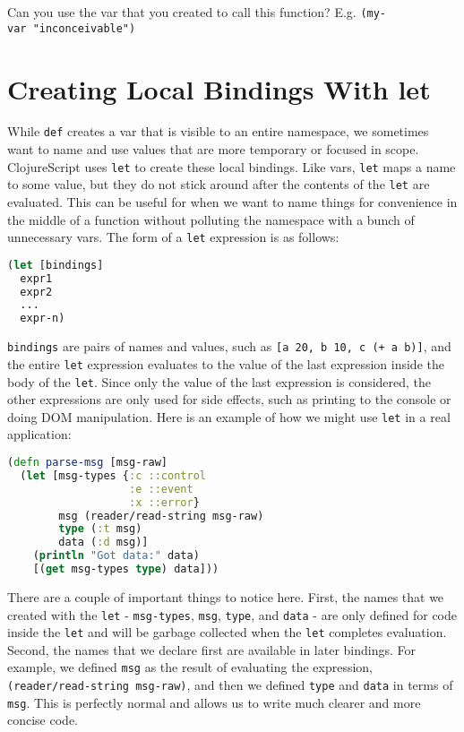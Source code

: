 \documentclass[10pt,twoside,openright]{memoir}
\begin{document}
Can you use the var that you created to call this function? E.g.
\texttt{(my-var\ "inconceivable")}

\section{Creating Local Bindings With let}

While \texttt{def} creates a var that is visible to an entire namespace,
we sometimes want to name and use values that are more temporary or
focused in scope. ClojureScript uses \texttt{let} to create these local
bindings. Like vars, \texttt{let} maps a name to some value, but they do
not stick around after the contents of the \texttt{let} are evaluated.
This can be useful for when we want to name things for convenience in
the middle of a function without polluting the namespace with a bunch of
unnecessary vars. The form of a \texttt{let} expression is as follows:

\begin{lstlisting}[language=Clojure, caption={Let expression}]
(let [bindings]
  expr1
  expr2
  ...
  expr-n)
\end{lstlisting}

\texttt{bindings} are pairs of names and values, such as
\texttt{{[}a\ 20,\ b\ 10,\ c\ (+\ a\ b){]}}, and the entire \texttt{let}
expression evaluates to the value of the last expression inside the body
of the \texttt{let}. Since only the value of the last expression is
considered, the other expressions are only used for side effects, such
as printing to the console or doing DOM manipulation. Here is an example
of how we might use \texttt{let} in a real application:

\begin{lstlisting}[language=Clojure, caption={Using let}]
(defn parse-msg [msg-raw]
  (let [msg-types {:c ::control
                   :e ::event
                   :x ::error}
        msg (reader/read-string msg-raw)
        type (:t msg)
        data (:d msg)]
    (println "Got data:" data)
    [(get msg-types type) data]))
\end{lstlisting}

There are a couple of important things to notice here. First, the names
that we created with the \texttt{let} - \texttt{msg-types},
\texttt{msg}, \texttt{type}, and \texttt{data} - are only defined for
code inside the \texttt{let} and will be garbage collected when the
\texttt{let} completes evaluation. Second, the names that we declare
first are available in later bindings. For example, we defined
\texttt{msg} as the result of evaluating the expression,
\texttt{(reader/read-string\ msg-raw)}, and then we defined
\texttt{type} and \texttt{data} in terms of \texttt{msg}. This is
perfectly normal and allows us to write much clearer and more concise
code.
\end{document}
